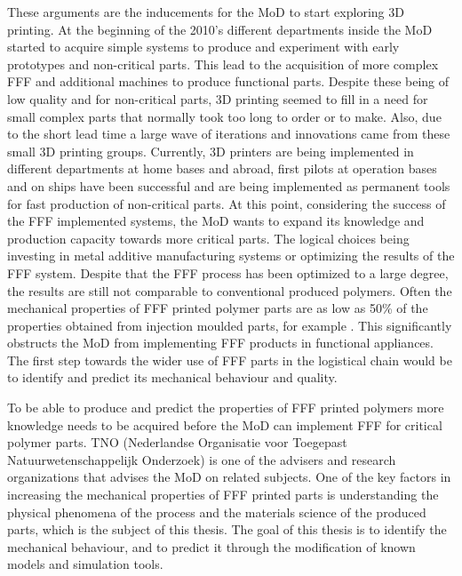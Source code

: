 These arguments are the inducements for the MoD to start exploring 3D printing. At the beginning of the 2010's different departments inside the MoD started to acquire simple systems to produce and experiment with early prototypes and non-critical parts. This lead to the acquisition of more complex FFF and additional machines to produce functional parts. Despite these being of low quality and for non-critical parts, 3D printing seemed to fill in a need for small complex parts that normally took too long to order or to make. Also, due to the short lead time a large wave of iterations and innovations came from these small 3D printing groups. Currently, 3D printers are being implemented in different departments at home bases and abroad, first pilots at operation bases and on ships have been successful and are being implemented as permanent tools for fast production of non-critical parts. At this point, considering the success of the FFF implemented systems, the MoD wants to expand its knowledge and production capacity towards more critical parts. The logical choices being investing in metal additive manufacturing systems or optimizing the results of the FFF system. Despite that the FFF process has been optimized to a large degree, the results are still not comparable to conventional produced polymers. Often the mechanical properties of FFF printed polymer parts are as low as 50\% of the properties obtained from injection moulded parts, for example . This significantly obstructs the MoD from implementing FFF products in functional appliances. The first step towards the wider use of FFF parts in the logistical chain would be to identify and predict its mechanical behaviour and quality.

To be able to produce and predict the properties of FFF printed polymers more knowledge needs to be acquired before the MoD can implement FFF for critical polymer parts. TNO (Nederlandse Organisatie voor Toegepast Natuurwetenschappelijk Onderzoek) is one of the advisers and research organizations that advises the MoD on related subjects. One of the key factors in increasing the mechanical properties of FFF printed parts is understanding the physical phenomena of the process and the materials science of the produced parts, which is the subject of this thesis. The goal of this thesis is to identify the mechanical behaviour, and to predict it through the modification of known models and simulation tools.


